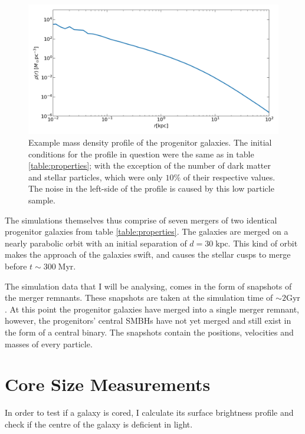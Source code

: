 \documentclass[english, oneside]{HYgradu}
\begin{document}
\begin{figure}
	\centering
	\includegraphics[width=\textwidth]{IC.png}
	\caption{Example mass density profile of the progenitor galaxies. The initial conditions for the profile in question were the same as in table \ref{table:properties}; with the exception of the number of dark matter and stellar particles, which were only $10\%$ of their respective values. The noise in the left-side of the profile is caused by this low particle sample.}
	\label{figure:IC_density_profile}
\end{figure}

The simulations themselves thus comprise of seven mergers of two identical progenitor galaxies from table \ref{table:properties}. The galaxies are merged on a nearly parabolic orbit with an initial separation of $d = 30 \; \mathrm{kpc}$. This kind of orbit makes the approach of the galaxies swift, and causes the stellar cusps to merge before $t \sim 300 \; \mathrm{Myr}$.

The simulation data that I will be analysing, comes in the form of snapshots of the merger remnants. These snapshots are taken at the simulation time of $\sim 2 \mathrm{Gyr}$. At this point the progenitor galaxies have merged into a single merger remnant, however, the progenitors' central SMBHs have not yet merged and still exist in the form of a central binary. The snapshots contain the positions, velocities and masses of every particle.

\section{Core Size Measurements}

In order to test if a galaxy is cored, I calculate its surface brightness profile and check if the centre of the galaxy is deficient in light.
\end{document}
